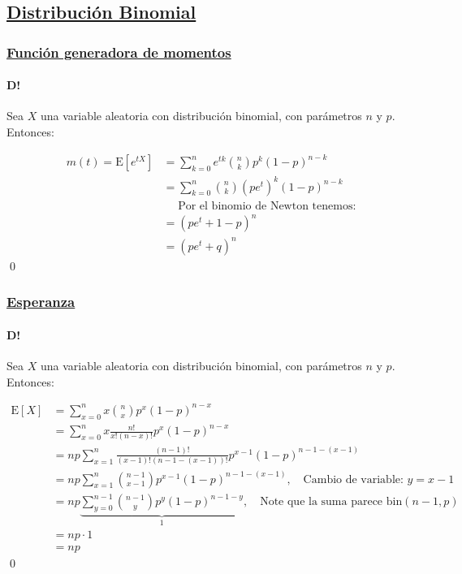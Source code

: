 \documentclass[8pt]{article}
\begin{document}
\subsection*{\hyperref[subsec:distribucion_binomial_tag]{Distribución Binomial}}
\label{subsec:distribucion_binomial}

\subsubsection*{\hyperref[subsec:funciongeneradora_binom_tag]{Función generadora de momentos}}
\label{subsec:funciongeneradora_binom}

\paragraph{D!} Sea $X$ una variable aleatoria con distribución binomial, con parámetros $n$ y $p$. Entonces:

\begin{align*}
    m(t) = \text{E}\left[e^{tX}\right] &= \sum_{k=0}^n e^{tk} \binom{n}{k} p^k (1-p)^{n-k} \\
    &= \sum_{k=0}^n \binom{n}{k} (pe^{t})^k (1-p)^{n-k} \\
    &\quad\,\, \text{Por el binomio de Newton tenemos:} \\
    &= (pe^{t} + 1-p)^n \\
    &= (pe^{t} + q)^n
\end{align*}\qed

\subsubsection*{\hyperref[subsec:esperanza_binom_tag]{Esperanza}}
\label{subsec:esperanza_binom}

\paragraph{D!} Sea $X$ una variable aleatoria con distribución binomial, con parámetros $n$ y $p$. Entonces:

\begin{align*}
    \text{E}[X] &= \sum_{x=0}^n x \binom{n}{x} p^x (1-p)^{n-x} \\
    &= \sum_{x=0}^n x \frac{n!}{x!(n-x)!} p^x (1-p)^{n-x} \\
    &= np \sum_{x=1}^n \frac{(n-1)!}{(x-1)!(n-1-(x-1))!} p^{x-1} (1-p)^{n-1-(x-1)} \\
    &= np \sum_{x=1}^n \binom{n-1}{x-1} p^{x-1} (1-p)^{n-1-(x-1)}, \quad \text{Cambio de variable: } y = x-1 \\
    &= np \underbrace{\sum_{y=0}^{n-1} \binom{n-1}{y} p^y (1-p)^{n-1-y}}_{1}, \quad \text{Note que la suma parece bin} (n-1, p) \\
    &= np \cdot 1 \\
    &= np
\end{align*}\qed
\end{document}
